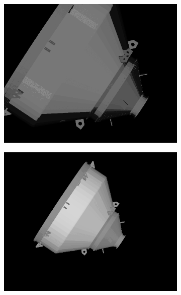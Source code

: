 \begin{figure}[!h]
    \begin{subfigure}{0.24\linewidth}
        \centering
        \includegraphics[width=\linewidth]{Images/TIR20m.png}
    \end{subfigure}\hfill
    \begin{subfigure}{0.24\linewidth}
        \centering
        \includegraphics[width=\linewidth]{Images/TIR40m.png}
    \end{subfigure}\hfill
    \begin{subfigure}{0.24\linewidth}
        \centering

\end{subfigure}
\end{figure}
